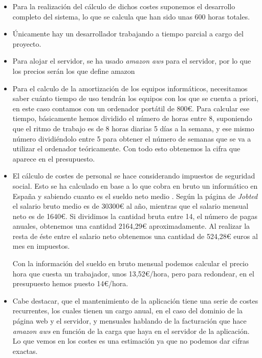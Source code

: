 \begin{itemize}
	\item Para la realización del cálculo de dichos costes suponemos el desarrollo completo del sistema, lo que se calcula que han sido unas 600 horas totales.
	\item Únicamente hay un desarrollador trabajando a tiempo parcial a cargo del proyecto.
	\item Para alojar el servidor, se ha usado \textit{amazon aws} para el servidor, por lo que los precios serán los que define amazon \cite{aws}
	\item Para el calculo de la amortización de los equipos informáticos, necesitamos saber cuánto tiempo de uso tendrán los equipos con los que se cuenta a priori, en este caso contamos con un ordenador portátil de 800€. Para calcular ese tiempo, básicamente hemos dividido el número de horas entre 8, suponiendo que el ritmo de trabajo es de 8 horas diarias 5 días a la semana, y ese mismo número dividiéndolo entre 5 para obtener el número de semanas que se va a utilizar el ordenador teóricamente. Con todo esto obtenemos la cifra que aparece en el presupuesto.
	
	\item El cálculo de costes de personal se hace considerando impuestos de seguridad social. Esto se ha calculado en base a lo que cobra en bruto un informático en España y sabiendo cuanto es el sueldo neto medio \cite{jobted}. Según la página de \textit{Jobted} el salario bruto medio es de 30300€ al año, mientras que el salario mensual neto es de 1640€. Si dividimos la cantidad bruta entre 14, el número de pagas anuales, obtenemos una cantidad 2164,29€ aproximadamente. Al realizar la resta de éste entre el salario neto obtenemos una cantidad de 524,28€ euros al mes en impuestos. 
	
	Con la información del sueldo en bruto mensual podemos calcular el precio hora que cuesta un trabajador, unos 13,52€/hora, pero para redondear, en el presupuesto hemos puesto 14€/hora.
	
	\item Cabe destacar, que el mantenimiento de la aplicación tiene una serie de costes recurrentes, los cuales tienen un cargo anual, en el caso del dominio de la página web y el servidor, y mensuales hablando de la facturación que hace \textit{amazon aws} en función de la carga que haya en el servidor de la aplicación. Lo que vemos en los costes es una estimación ya que no podemos dar cifras exactas.
	
\end{itemize}

